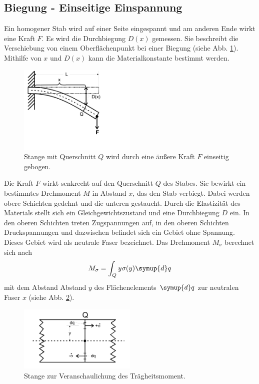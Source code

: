 \subsection{Biegung - Einseitige Einspannung}
Ein homogener Stab wird auf einer Seite eingespannt und am anderen Ende wirkt eine Kraft $F$.
Es wird die Durchbiegung $D(x)$ gemessen.
Sie beschreibt die Verschiebung von einem Oberflächenpunkt bei einer Biegung (siehe Abb. \ref{fig:stab_einseitig}).
Mithilfe von $x$ und $D(x)$ kann die Materialkonstante bestimmt werden.
\begin{figure}
    \centering
    \includegraphics[width=0.5\textwidth]{content/data/biegen_einseitig.jpg}
    \caption{Stange mit Querschnitt $Q$ wird durch eine äußere Kraft $F$ einseitig gebogen.\cite{anleitung}}
    \label{fig:stab_einseitig}
\end{figure}
Die Kraft $F$ wirkt senkrecht auf den Querschnitt $Q$ des Stabes.
Sie bewirkt ein bestimmtes Drehmoment $M$ in Abstand $x$, das den Stab verbiegt.
Dabei werden obere Schichten gedehnt und die unteren gestaucht.
Durch die Elastizität des Materials stellt sich ein Gleichgewichtszustand und eine Durchbiegung $D$ ein.
In den oberen Schichten treten Zugspannungen auf, in den oberen Schichten Druckspannungen und dazwischen befindet sich ein Gebiet ohne Spannung.
Dieses Gebiet wird als neutrale Faser bezeichnet.
Das Drehmoment $M_\sigma$ berechnet sich nach
\begin{equation}
    M_\sigma = \int_Q y \sigma(y) \symup{d}q
\end{equation}
mit dem Abstand Abstand $y$ des Flächenelements $\symup{d}q$ zur neutralen Faser $x$ (siehe Abb. \ref{fig:drehmoment}).
\begin{figure}
    \centering
    \includegraphics[width=0.5\textwidth]{content/data/drehmoment.jpg}
    \caption{Stange zur Veranschaulichung des Trägheitsmoment.\cite{anleitung}}
    \label{fig:drehmoment}
\end{figure}
